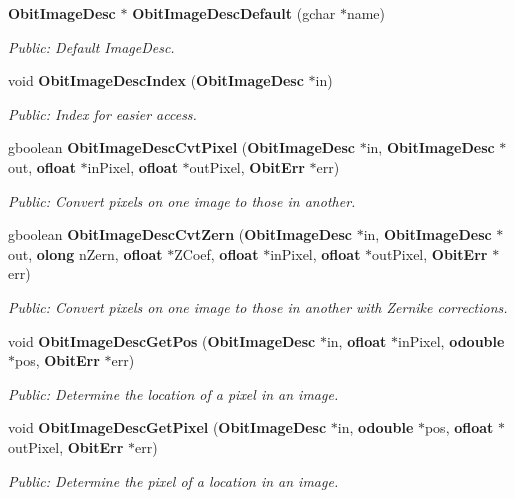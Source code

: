 \begin{CompactItemize}
{\bf Obit\-Image\-Desc} $\ast$ {\bf Obit\-Image\-Desc\-Default} (gchar $\ast$name)
\begin{CompactList}\small\item\em Public: Default Image\-Desc. \item\end{CompactList}\item 
void {\bf Obit\-Image\-Desc\-Index} ({\bf Obit\-Image\-Desc} $\ast$in)
\begin{CompactList}\small\item\em Public: Index for easier access. \item\end{CompactList}\item 
gboolean {\bf Obit\-Image\-Desc\-Cvt\-Pixel} ({\bf Obit\-Image\-Desc} $\ast$in, {\bf Obit\-Image\-Desc} $\ast$out, {\bf ofloat} $\ast$in\-Pixel, {\bf ofloat} $\ast$out\-Pixel, {\bf Obit\-Err} $\ast$err)
\begin{CompactList}\small\item\em Public: Convert pixels on one image to those in another. \item\end{CompactList}\item 
gboolean {\bf Obit\-Image\-Desc\-Cvt\-Zern} ({\bf Obit\-Image\-Desc} $\ast$in, {\bf Obit\-Image\-Desc} $\ast$out, {\bf olong} n\-Zern, {\bf ofloat} $\ast$ZCoef, {\bf ofloat} $\ast$in\-Pixel, {\bf ofloat} $\ast$out\-Pixel, {\bf Obit\-Err} $\ast$err)
\begin{CompactList}\small\item\em Public: Convert pixels on one image to those in another with Zernike corrections. \item\end{CompactList}\item 
void {\bf Obit\-Image\-Desc\-Get\-Pos} ({\bf Obit\-Image\-Desc} $\ast$in, {\bf ofloat} $\ast$in\-Pixel, {\bf odouble} $\ast$pos, {\bf Obit\-Err} $\ast$err)
\begin{CompactList}\small\item\em Public: Determine the location of a pixel in an image. \item\end{CompactList}\item 
void {\bf Obit\-Image\-Desc\-Get\-Pixel} ({\bf Obit\-Image\-Desc} $\ast$in, {\bf odouble} $\ast$pos, {\bf ofloat} $\ast$out\-Pixel, {\bf Obit\-Err} $\ast$err)
\begin{CompactList}\small\item\em Public: Determine the pixel of a location in an image. \item\end{CompactList}\item 

\end{CompactItemize}
